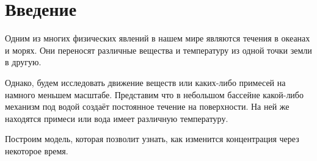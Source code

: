 \section{Введение}
    Одним из многих физических явлений в нашем мире являются течения в океанах и морях. Они переносят различные вещества и температуру из одной точки земли в другую.

    Однако, будем исследовать движение веществ или каких-либо примесей на намного меньшем масштабе. Представим что в небольшом бассейне какой-либо механизм под водой создаёт постоянное течение на поверхности. На ней же находятся примеси или вода имеет различную температуру.
    
    Построим модель, которая позволит узнать, как изменится концентрация через некоторое время.